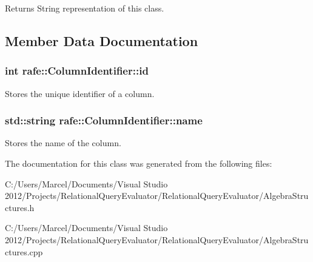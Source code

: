 \begin{DoxyReturn}{Returns}
String representation of this class. 
\end{DoxyReturn}


\subsection{Member Data Documentation}
\hypertarget{classrafe_1_1_column_identifier_afa735a6e57d40b1d7e25c6cc781d3a4d}{
\subsubsection[{id}]{\setlength{\rightskip}{0pt plus 5cm}int rafe\+::\+Column\+Identifier\+::id}}\label{classrafe_1_1_column_identifier_afa735a6e57d40b1d7e25c6cc781d3a4d}
Stores the unique identifier of a column. \hypertarget{classrafe_1_1_column_identifier_a65aaf13619c20f17be5f8bdda2c6d28f}{
\subsubsection[{name}]{\setlength{\rightskip}{0pt plus 5cm}std\+::string rafe\+::\+Column\+Identifier\+::name}}\label{classrafe_1_1_column_identifier_a65aaf13619c20f17be5f8bdda2c6d28f}
Stores the name of the column. 

The documentation for this class was generated from the following files\+:\begin{DoxyCompactItemize}
\item 
C\+:/\+Users/\+Marcel/\+Documents/\+Visual Studio 2012/\+Projects/\+Relational\+Query\+Evaluator/\+Relational\+Query\+Evaluator/Algebra\+Structures.\+h\item 
C\+:/\+Users/\+Marcel/\+Documents/\+Visual Studio 2012/\+Projects/\+Relational\+Query\+Evaluator/\+Relational\+Query\+Evaluator/Algebra\+Structures.\+cpp\end{DoxyCompactItemize}
